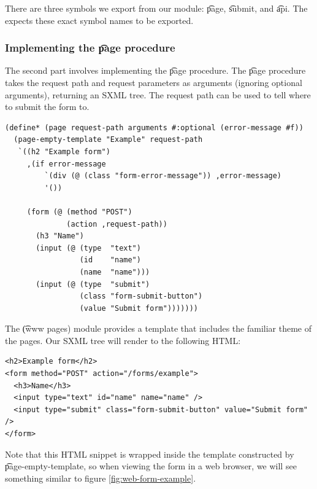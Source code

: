   There are three symbols we export from our module: \t{page}, \t{submit}, and
  \t{api}.  The  expects these exact symbol names to be
  exported.

\subsubsection{Implementing the \t{page} procedure}

  The second part involves implementing the \t{page} procedure. The \t{page}
  procedure takes the request path and request parameters as arguments
  (ignoring optional arguments), returning an SXML tree.  The request path
  can be used to tell where to submit the form to.

\begin{siderules}
\begin{verbatim}
(define* (page request-path arguments #:optional (error-message #f))
  (page-empty-template "Example" request-path
   `((h2 "Example form")
     ,(if error-message
         `(div (@ (class "form-error-message")) ,error-message)
         '())

     (form (@ (method "POST")
              (action ,request-path))
       (h3 "Name")
       (input (@ (type  "text")
                 (id    "name")
                 (name  "name")))
       (input (@ (type  "submit")
                 (class "form-submit-button")
                 (value "Submit form")))))))
\end{verbatim}
\end{siderules}

  The \t{(www pages)} module provides a template that includes the familiar
  theme of the  pages.  Our SXML tree will render to the
  following HTML:

\begin{siderules}
\begin{verbatim}
<h2>Example form</h2>
<form method="POST" action="/forms/example">
  <h3>Name</h3>
  <input type="text" id="name" name="name" />
  <input type="submit" class="form-submit-button" value="Submit form" />
</form>
\end{verbatim}
\end{siderules}

  Note that this HTML snippet is wrapped inside the template constructed by
  \t{page-empty-template}, so when viewing the form in a web browser, we
  will see something similar to figure \ref{fig:web-form-example}.

